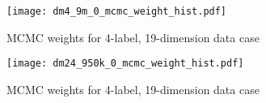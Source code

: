 


\begin{figure}[H]
    \centerline{\texttt{[image: dm4\_9m\_0\_mcmc\_weight\_hist.pdf]}}
    \caption{MCMC weights for 4-label, 19-dimension data case }
    \label{fig:4l-mcmc_weights}
\end{figure}

\begin{figure}[H]
    \centerline{\texttt{[image: dm24\_950k\_0\_mcmc\_weight\_hist.pdf]}}
    \caption{MCMC weights for 4-label, 19-dimension data case }
    \label{fig:24l-mcmc_weights}
\end{figure}

